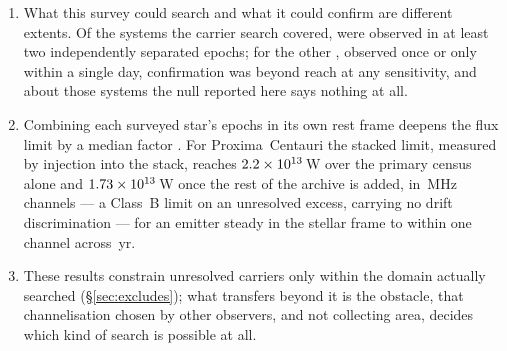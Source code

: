\begin{enumerate}[leftmargin=1.6em,itemsep=4pt,topsep=4pt,parsep=0pt]
\item What this survey could search and what it could confirm are different
extents. Of the \NSysClassA{} systems the carrier search covered,
\ScSysIndep{} were observed in at least two independently separated epochs;
for the other \ScSysNoConf, observed once or only within a single day,
confirmation was beyond reach at any sensitivity, and about those systems the
null reported here says nothing at all.

\item Combining each surveyed star's epochs in its own rest frame deepens
the flux limit by a median factor \SyStkGainMed. For Proxima~Centauri the
stacked limit, measured by injection into the stack, reaches
$2.2\times10^{13}$\,W over the primary census alone and
$1.73\times10^{13}$\,W once the rest of the archive is added, in
\ChanBModeMHz\,MHz channels --- a Class~B limit on an unresolved excess,
carrying no drift discrimination --- for an emitter steady in the stellar
frame to within one channel across \StkProxSpanYr\,yr.

\item These results constrain unresolved carriers only within the domain
actually searched (\S\ref{sec:excludes}); what transfers beyond it is the
obstacle, that channelisation chosen by other observers, and not
collecting area, decides which kind of search is possible at all.

\end{enumerate}
